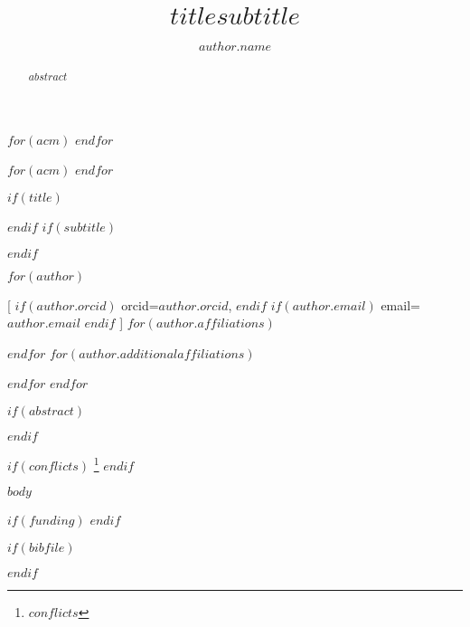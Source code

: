 \documentclass[twocolumn]{ceurart}
\begin{document}
$for(acm)$
$endfor$


$for(acm)$
$endfor$

$if(title)$
\title{$title$}
$endif$
$if(subtitle)$
\title[mode=sub]{$subtitle$}
$endif$

$for(author)$
  \author[]{$author.name$}[%
	$if(author.orcid)$
		orcid=$author.orcid$,
	$endif$
	$if(author.email)$
		email=$author.email$
	$endif$
	]
	$for(author.affiliations)$
		\address[]{
			$if(author.affiliations.institution)$
				$author.affiliations.institution$,
			$endif$
			$if(author.affiliations.department)$
				$author.affiliations.department$,
			$endif$
			$if(author.affiliations.city)$
				$author.affiliations.city$,
			$endif$
			$if(author.affiliations.state)$
				$author.affiliations.state$,
			$endif$
			$if(author.affiliations.country)$
				$author.affiliations.country$
			$endif$
		}
	$endfor$
	$for(author.additionalaffiliations)$
		\address[]{
			$if(author.additionalaffiliations.institution)$
				$author.additionalaffiliations.institution$,
			$endif$
			$if(author.additionalaffiliations.department)$
				$author.additionalaffiliations.department$,
			$endif$
			$if(author.additionalaffiliations.city)$
				$author.additionalaffiliations.city$,
			$endif$
			$if(author.additionalaffiliations.state)$
				$author.additionalaffiliations.state$,
			$endif$
			$if(author.additionalaffiliations.country)$
				$author.additionalaffiliations.country$
			$endif$
		}
	$endfor$
$endfor$

$if(abstract)$
\begin{abstract}
$abstract$
\end{abstract}
$endif$


\maketitle

$if(conflicts)$
{\let\thefootnote\relax\footnote{$conflicts$}}
$endif$

$body$

$if(funding)$
$endif$

$if(bibfile)$

$endif$
\end{document}
